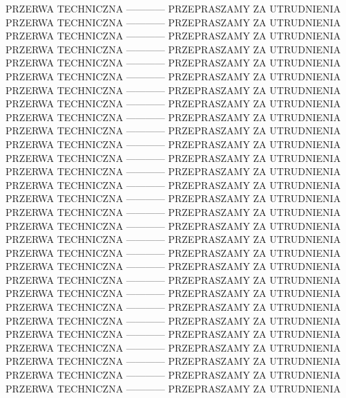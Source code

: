 \documentclass[fleqn]{article}
\begin{document}
                                  PRZERWA TECHNICZNA  ------------  PRZEPRASZAMY ZA UTRUDNIENIA
                                  PRZERWA TECHNICZNA  ------------  PRZEPRASZAMY ZA UTRUDNIENIA
                                  PRZERWA TECHNICZNA  ------------  PRZEPRASZAMY ZA UTRUDNIENIA
                                  PRZERWA TECHNICZNA  ------------  PRZEPRASZAMY ZA UTRUDNIENIA
                                  PRZERWA TECHNICZNA  ------------  PRZEPRASZAMY ZA UTRUDNIENIA
                                  PRZERWA TECHNICZNA  ------------  PRZEPRASZAMY ZA UTRUDNIENIA
                                  PRZERWA TECHNICZNA  ------------  PRZEPRASZAMY ZA UTRUDNIENIA
                                  PRZERWA TECHNICZNA  ------------  PRZEPRASZAMY ZA UTRUDNIENIA
                                  PRZERWA TECHNICZNA  ------------  PRZEPRASZAMY ZA UTRUDNIENIA
                                  PRZERWA TECHNICZNA  ------------  PRZEPRASZAMY ZA UTRUDNIENIA
                                  PRZERWA TECHNICZNA  ------------  PRZEPRASZAMY ZA UTRUDNIENIA
                                  PRZERWA TECHNICZNA  ------------  PRZEPRASZAMY ZA UTRUDNIENIA
                                  PRZERWA TECHNICZNA  ------------  PRZEPRASZAMY ZA UTRUDNIENIA
                                  PRZERWA TECHNICZNA  ------------  PRZEPRASZAMY ZA UTRUDNIENIA
                                  PRZERWA TECHNICZNA  ------------  PRZEPRASZAMY ZA UTRUDNIENIA
                                  PRZERWA TECHNICZNA  ------------  PRZEPRASZAMY ZA UTRUDNIENIA
                                  PRZERWA TECHNICZNA  ------------  PRZEPRASZAMY ZA UTRUDNIENIA
                                  PRZERWA TECHNICZNA  ------------  PRZEPRASZAMY ZA UTRUDNIENIA
                                  PRZERWA TECHNICZNA  ------------  PRZEPRASZAMY ZA UTRUDNIENIA
                                  PRZERWA TECHNICZNA  ------------  PRZEPRASZAMY ZA UTRUDNIENIA
                                  PRZERWA TECHNICZNA  ------------  PRZEPRASZAMY ZA UTRUDNIENIA
                                  PRZERWA TECHNICZNA  ------------  PRZEPRASZAMY ZA UTRUDNIENIA
                                  PRZERWA TECHNICZNA  ------------  PRZEPRASZAMY ZA UTRUDNIENIA
                                  PRZERWA TECHNICZNA  ------------  PRZEPRASZAMY ZA UTRUDNIENIA
                                  PRZERWA TECHNICZNA  ------------  PRZEPRASZAMY ZA UTRUDNIENIA
                                  PRZERWA TECHNICZNA  ------------  PRZEPRASZAMY ZA UTRUDNIENIA
                                  PRZERWA TECHNICZNA  ------------  PRZEPRASZAMY ZA UTRUDNIENIA
                                  PRZERWA TECHNICZNA  ------------  PRZEPRASZAMY ZA UTRUDNIENIA
                                  PRZERWA TECHNICZNA  ------------  PRZEPRASZAMY ZA UTRUDNIENIA
\end{document}

